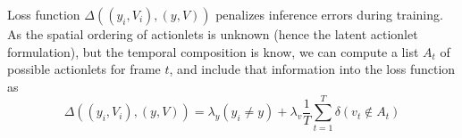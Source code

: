 Loss function $\Delta((y_i,V_i),(y,V))$ penalizes inference errors during 
training. As the spatial ordering of actionlets is unknown (hence the latent 
actionlet formulation), but the temporal composition is know, we can compute a 
list $A_t$ of possible actionlets for frame $t$, and include  that information 
into the loss function as
\begin{equation}
\Delta((y_i,V_i),(y,V)) = \lambda_y(y_i \ne y) + \lambda_v\frac{1}{T}\sum_{t=1}^T 
\delta(v_t \notin A_t)
\end{equation}

